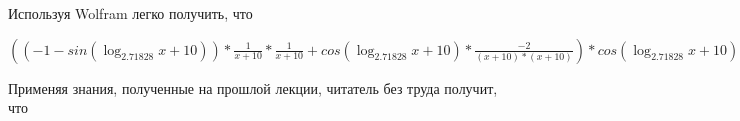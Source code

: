 \documentclass[12pt,a4paper,fleqn]{article}
\theoremstyle{definition}
\begin{document}
Используя Wolfram легко получить, что 

$(( -1  - sin(\log_{ 2.71828 }{ x  +  10 })) * \frac{ 1 }{ x  +  10 }
 * \frac{ 1 }{ x  +  10 }
 + cos(\log_{ 2.71828 }{ x  +  10 }) * \frac{ -2 }{( x  +  10 ) * ( x  +  10 )}
) * cos(\log_{ 2.71828 }{ x  +  10 }) * \frac{ 1 }{ x  +  10 }
 * { 3 }^{sin(\log_{ 2.71828 }{ x  +  10 })} + cos(\log_{ 2.71828 }{ x  +  10 }) * \frac{ 1 }{ x  +  10 }
 * ((( -1  - sin(\log_{ 2.71828 }{ x  +  10 })) * \frac{ 1 }{ x  +  10 }
 * \frac{ 1 }{ x  +  10 }
 + cos(\log_{ 2.71828 }{ x  +  10 }) * \frac{ -2 }{( x  +  10 ) * ( x  +  10 )}
) * { 3 }^{sin(\log_{ 2.71828 }{ x  +  10 })} + cos(\log_{ 2.71828 }{ x  +  10 }) * \frac{ 1 }{ x  +  10 }
 * cos(\log_{ 2.71828 }{ x  +  10 }) * \frac{ 1 }{ x  +  10 }
 * { 3 }^{sin(\log_{ 2.71828 }{ x  +  10 })}) = (( -1  - sin(\log_{ 2.71828 }{ x  +  10 })) * \frac{ 1 }{ x  +  10 }
 * \frac{ 1 }{ x  +  10 }
 + cos(\log_{ 2.71828 }{ x  +  10 }) * \frac{ -2 }{( x  +  10 ) * ( x  +  10 )}
) * cos(\log_{ 2.71828 }{ x  +  10 }) * \frac{ 1 }{ x  +  10 }
 * { 3 }^{sin(\log_{ 2.71828 }{ x  +  10 })} + cos(\log_{ 2.71828 }{ x  +  10 }) * \frac{ 1 }{ x  +  10 }
 * ((( -1  - sin(\log_{ 2.71828 }{ x  +  10 })) * \frac{ 1 }{ x  +  10 }
 * \frac{ 1 }{ x  +  10 }
 + cos(\log_{ 2.71828 }{ x  +  10 }) * \frac{ -2 }{( x  +  10 ) * ( x  +  10 )}
) * { 3 }^{sin(\log_{ 2.71828 }{ x  +  10 })} + cos(\log_{ 2.71828 }{ x  +  10 }) * \frac{ 1 }{ x  +  10 }
 * cos(\log_{ 2.71828 }{ x  +  10 }) * \frac{ 1 }{ x  +  10 }
 * { 3 }^{sin(\log_{ 2.71828 }{ x  +  10 })})$

Применяя знания, полученные на прошлой лекции, читатель без труда получит, что 
\end{document}
